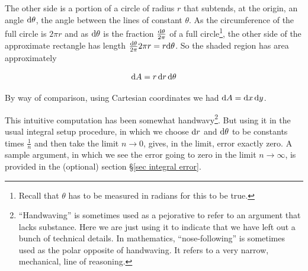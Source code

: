 The other side is a portion of a circle of radius $r$ that subtends,
at the origin, an angle $\mathrm{d}\theta$, the angle between the lines 
of constant $\theta$. As the circumference of the full circle is $2\pi r$
and as $\mathrm{d}\theta$ is the fraction $\frac{\mathrm{d}\theta}{2\pi}$
of a full circle\footnote{Recall that $\theta$ has to be measured in radians for
this to be true.}, the other side of the approximate rectangle has length
$\frac{\mathrm{d}\theta}{2\pi}2\pi r = r\mathrm{d}\theta$. So the shaded
region has area approximately 
\begin{impeqn}\label{eq dA polar}
\begin{equation*}
\mathrm{d}A = r\,\mathrm{d}r\,\mathrm{d}\theta
\end{equation*}
\end{impeqn}\noindent
By way of comparison, using Cartesian coordinates we had $\mathrm{d}A
=\mathrm{d}x\,\mathrm{d}y$.

This intuitive computation has been somewhat handwavy\footnote{
``Handwaving'' is sometimes used as a pejorative to refer to
an argument that lacks substance. Here we are just using it to indicate
that we have left out a bunch of technical details.
In mathematics, ``nose-following'' is sometimes used as the polar opposite 
of handwaving. It refers to a very narrow, mechanical, line of reasoning.}. 
But using it in
the usual integral setup procedure, in which we choose $\mathrm{d}r$ and
$\mathrm{d}\theta$ to be constants times $\frac{1}{n}$ and then take the limit
$n\rightarrow 0$, gives, in the limit, error exactly zero. A sample argument,
in which we see the error going to zero in the limit $n\rightarrow\infty$,
is provided in the (optional) section \S\ref{sec integral error}. 


